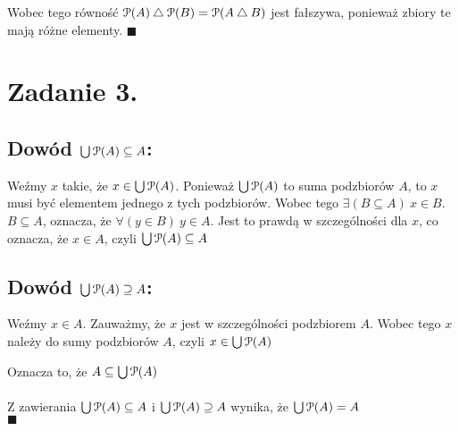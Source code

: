 \documentclass{article}
\begin{document}
Wobec tego równość $ \mathcal{P} (A) \bigtriangleup \mathcal{P} (B) = \mathcal{P} (A\bigtriangleup B) $ jest fałszywa, ponieważ zbiory te mają różne elementy. $\blacksquare$


\section*{Zadanie 3.}

\subsection*{Dowód $\bigcup \mathcal{P}(A) \subseteq A$:}

Weźmy $x$ takie, że $x \in \bigcup \mathcal{P}(A)$. Ponieważ $\bigcup \mathcal{P}(A)$ to suma podzbiorów $A$, to $x$ musi być elementem jednego z tych podzbiorów. Wobec tego $\exists(B \subseteq A) \ x\in B$.
\\
$B \subseteq A$, oznacza, że $\forall(y\in B)\ y\in A$. Jest to prawdą w szczególności dla $x$, co oznacza, że $x\in A$, czyli  $\bigcup \mathcal{P}(A) \subseteq A$

\subsection*{Dowód $\bigcup \mathcal{P}(A) \supseteq A$:}

Weźmy $x \in A$. Zauważmy, że $x$ jest w szczególności podzbiorem $A$. Wobec tego $x$ należy do sumy podzbiorów $A$, czyli $x \in \bigcup \mathcal{P}(A)$

Oznacza to, że $A \subseteq \bigcup \mathcal{P}(A)$
\\\\
Z zawierania $\bigcup \mathcal{P}(A) \subseteq A$ i $\bigcup \mathcal{P}(A) \supseteq A$ wynika, że $\bigcup \mathcal{P}(A) = A$\\
$\blacksquare$
\end{document}
